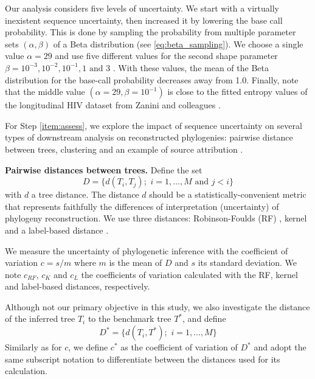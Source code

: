 \documentclass[10pt]{article}
\begin{document}
Our analysis considers five levels of uncertainty. We start with a virtually inexistent sequence uncertainty, then increased it by lowering the base call probability. This is done by sampling the probability from multiple parameter sets $(\alpha,\beta)$ of a Beta distribution (see \autoref{eq:beta_sampling}). 
We choose a single value $\alpha=29$ and use five different values for the second shape parameter $\beta = 10^{-3}, 10^{-2}, 10^{-1}, 1 \text{ and } 3$ .
With these values, the mean of the Beta distribution for the base-call probability decreases away from 1.0. 
Finally, note that the middle value $(\alpha=29, \beta=10^{-1})$ is close to the fitted entropy values of the longitudinal HIV dataset from Zanini and colleagues \cite{Zanini:2015}.

For Step \ref{item:assess}, we explore the impact of sequence uncertainty on several types of downstream analysis on reconstructed phylogenies: pairwise distance between trees, clustering and an example of source attribution .


\textbf{Pairwise distances between trees.}
Define the set 
\begin{equation}
D = \{d(T_i,T_j);\,\, i=1,\ldots, M \text{ and } j<i \}
\end{equation}
with $d$ a tree distance. 
The distance $d$ should be a statistically-convenient metric that represents faithfully the differences of interpretation (\ie uncertainty) of phylogeny reconstruction. 
We use three distances:  Robinson-Foulds (RF) \cite{Robinson:1981}, kernel \cite{Poon:2013} and a label-based distance \cite{xxx}. 

We measure the uncertainty of phylogenetic inference with the coefficient of variation $c = s / m$ where $m$ is the mean of $D$ and $s$ its standard deviation.
We note $c_{RF}$, $c_K$ and $c_{L}$ the coefficients of variation calculated with the RF, kernel and label-based distances, respectively.

Although not our primary objective in this study, we also investigate the distance of the inferred tree $T_i$ to the benchmark tree $T^*$, and define 
\begin{equation}
D^* = \{d(T_i,T^*);\,\, i=1,\ldots, M \} 
\end{equation}
Similarly as for $c$, we define $c^*$ as the coefficient of variation of $D^*$ and adopt the same subscript notation to differentiate between the distances used for its calculation.
\end{document}
